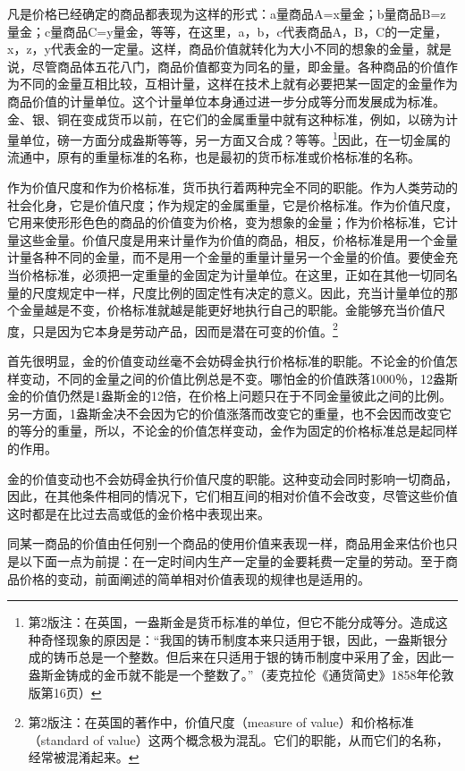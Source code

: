 \documentclass{ctexbook}
\begin{document}
    凡是价格已经确定的商品都表现为这样的形式：a量商品A=x量金；b量商品B=z量金；c量商品C=y量金，等等，在这里，a，b，c代表商品A，B，C的一定量，x，z，y代表金的一定量。这样，商品价值就转化为大小不同的想象的金量，就是说，尽管商品体五花八门，商品价值都变为同名的量，即金量。各种商品的价值作为不同的金量互相比较，互相计量，这样在技术上就有必要把某一固定的金量作为商品价值的计量单位。这个计量单位本身通过进一步分成等分而发展成为标准。金、银、铜在变成货币以前，在它们的金属重量中就有这种标准，例如，以磅为计量单位，磅一方面分成盎斯等等，另一方面又合成？等等。\footnote{第2版注：在英国，一盎斯金是货币标准的单位，但它不能分成等分。造成这种奇怪现象的原因是：“我国的铸币制度本来只适用于银，因此，一盎斯银分成的铸币总是一个整数。但后来在只适用于银的铸币制度中采用了金，因此一盎斯金铸成的金币就不能是一个整数了。”（麦克拉伦《通货简史》1858年伦敦版第16页）}因此，在一切金属的流通中，原有的重量标准的名称，也是最初的货币标准或价格标准的名称。

    作为价值尺度和作为价格标准，货币执行着两种完全不同的职能。作为人类劳动的社会化身，它是价值尺度；作为规定的金属重量，它是价格标准。作为价值尺度，它用来使形形色色的商品的价值变为价格，变为想象的金量；作为价格标准，它计量这些金量。价值尺度是用来计量作为价值的商品，相反，价格标准是用一个金量计量各种不同的金量，而不是用一个金量的重量计量另一个金量的价值。要使金充当价格标准，必须把一定重量的金固定为计量单位。在这里，正如在其他一切同名量的尺度规定中一样，尺度比例的固定性有决定的意义。因此，充当计量单位的那个金量越是不变，价格标准就越是能更好地执行自己的职能。金能够充当价值尺度，只是因为它本身是劳动产品，因而是潜在可变的价值。\footnote{第2版注：在英国的著作中，价值尺度（measure of value）和价格标准（standard of value）这两个概念极为混乱。它们的职能，从而它们的名称，经常被混淆起来。}

    首先很明显，金的价值变动丝毫不会妨碍金执行价格标准的职能。不论金的价值怎样变动，不同的金量之间的价值比例总是不变。哪怕金的价值跌落1000％，12盎斯金的价值仍然是1盎斯金的12倍，在价格上问题只在于不同金量彼此之间的比例。另一方面，1盎斯金决不会因为它的价值涨落而改变它的重量，也不会因而改变它的等分的重量，所以，不论金的价值怎样变动，金作为固定的价格标准总是起同样的作用。

    金的价值变动也不会妨碍金执行价值尺度的职能。这种变动会同时影响一切商品，因此，在其他条件相同的情况下，它们相互间的相对价值不会改变，尽管这些价值这时都是在比过去高或低的金价格中表现出来。

    同某一商品的价值由任何别一个商品的使用价值来表现一样，商品用金来估价也只是以下面一点为前提：在一定时间内生产一定量的金要耗费一定量的劳动。至于商品价格的变动，前面阐述的简单相对价值表现的规律也是适用的。
\end{document}
